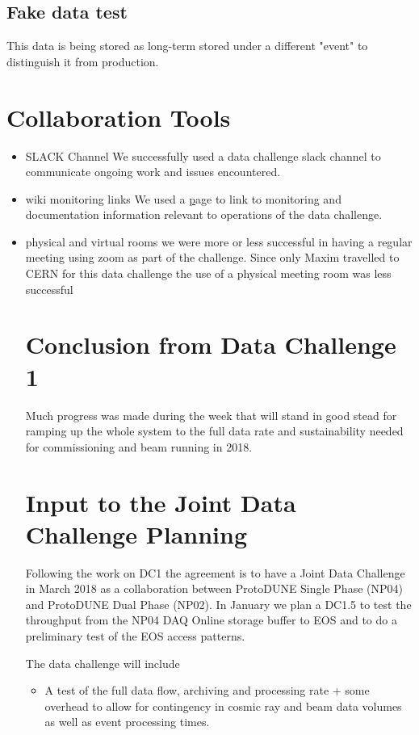 \documentclass[pdftex,12pt,letter]{article}
\begin{document}
\subsection {Fake data test}
 This data is being stored as long-term stored under a different "event" to distinguish it from production.

\section {Collaboration Tools}
\begin {itemize}
\item SLACK Channel
We successfully used a data challenge slack channel to communicate ongoing work and issues encountered. 
\item  wiki monitoring links
We used a
\href {wiki.dunescience.org} page to link to monitoring and documentation information relevant to operations of the data challenge. 
\item physical and virtual rooms 
we were more or less successful in having  a regular meeting using zoom as part of the challenge. Since only Maxim travelled to CERN for this data challenge the use of a physical meeting room was less successful


\section {Conclusion from Data Challenge 1}

Much progress was made during the week that  will stand in good stead for ramping up the whole system to the full data rate and sustainability needed for commissioning and beam running in 2018. 

\section {Input to the Joint Data Challenge Planning}
Following the work on DC1 the  agreement is to have a Joint Data Challenge in March 2018 as a collaboration between ProtoDUNE Single Phase (NP04) and ProtoDUNE Dual Phase (NP02). In January we plan a DC1.5 to test the throughput from the NP04 DAQ Online storage buffer to EOS and to do a preliminary test of the EOS access patterns. 

The data challenge will include

\begin{itemize}

\item  A  test of the full data flow, archiving and processing rate + some overhead to allow for contingency in cosmic ray and beam data volumes as well as event processing times. 


\end{itemize}
\end{itemize}
\end{document}

